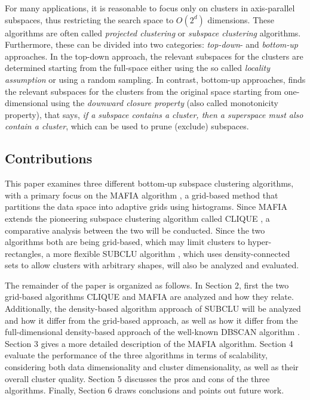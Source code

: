 For many applications, it is reasonable to focus only on clusters in axis-parallel subspaces, thus restricting the search space to $O(2^d)$ dimensions. These algorithms are often called \textit{projected clustering} or \textit{subspace clustering} algorithms. Furthermore, these can be divided into two categories: \textit{top-down}- and \textit{bottom-up} approaches. In the top-down approach, the relevant subspaces for the clusters are determined starting from the full-space either using the so called \textit{locality assumption} or using a random sampling. In contrast, bottom-up approaches, finds the relevant subspaces for the clusters from the original space starting from one-dimensional using the \textit{downward closure property} (also called monotonicity property), that says, \textit{if a subspace contains a cluster, then a superspace must also contain a cluster}, which can be used to prune (exclude) subspaces. \cite[p.~8,~11]{kriegel-2009}

\subsection{Contributions}
This paper examines three different bottom-up subspace clustering algorithms, with a primary focus on the MAFIA algorithm \cite{mafia}, a grid-based method that partitions the data space into adaptive grids using histograms. Since MAFIA extends the pioneering subspace clustering algorithm called CLIQUE \cite{clique}, a comparative analysis between the two will be conducted. Since the two algorithms both are being grid-based, which may limit clusters to hyper-rectangles, a more flexible SUBCLU algorithm \cite{subclu}, which uses density-connected sets to allow clusters with arbitrary shapes, will also be analyzed and evaluated.

The remainder of the paper is organized as follows. In Section 2, first the two grid-based algorithms CLIQUE and MAFIA are analyzed and how they relate. Additionally, the density-based algorithm approach of SUBCLU will be analyzed and how it differ from the grid-based approach, as well as how it differ from the full-dimensional density-based approach of the well-known DBSCAN algorithm \cite{dbscan}. Section 3 gives a more detailed description of the MAFIA algorithm. Section 4 evaluate the performance of the three algorithms in terms of scalability, considering both data dimensionality and cluster dimensionality, as well as their overall cluster quality. Section 5 discusses the pros and cons of the three algorithms. Finally, Section 6 draws conclusions and points out future work.
